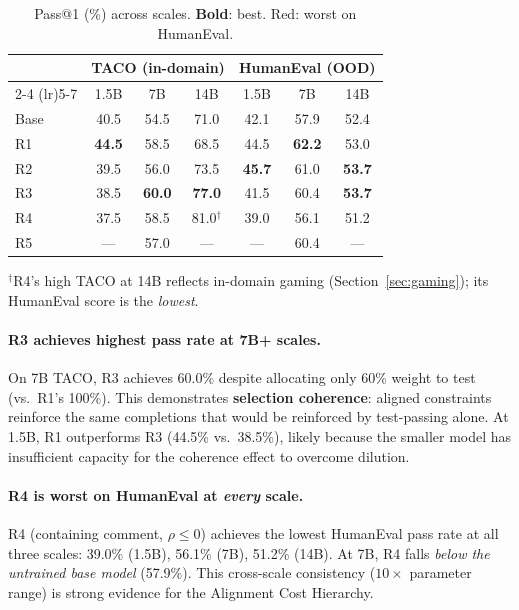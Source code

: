 \documentclass{article}
\begin{document}
\begin{table}[t]
\centering
\caption{Pass@1 (\%) across scales. \textbf{Bold}: best. \colorbox{red!10}{Red}: worst on HumanEval.}
\label{tab:pass_rates}
\begin{tabular}{lcccccc}
\toprule
& \multicolumn{3}{c}{TACO (in-domain)} & \multicolumn{3}{c}{HumanEval (OOD)} \\
\cmidrule(lr){2-4} \cmidrule(lr){5-7}
& 1.5B & 7B & 14B & 1.5B & 7B & 14B \\
\midrule
Base & 40.5 & 54.5 & 71.0 & 42.1 & 57.9 & 52.4 \\
R1 & \textbf{44.5} & 58.5 & 68.5 & 44.5 & \textbf{62.2} & 53.0 \\
R2 & 39.5 & 56.0 & 73.5 & \textbf{45.7} & 61.0 & \textbf{53.7} \\
R3 & 38.5 & \textbf{60.0} & \textbf{77.0} & 41.5 & 60.4 & \textbf{53.7} \\
R4 & 37.5 & 58.5 & 81.0$^\dagger$ & \colorbox{red!10}{39.0} & \colorbox{red!10}{56.1} & \colorbox{red!10}{51.2} \\
R5 & --- & 57.0 & --- & --- & 60.4 & --- \\
\bottomrule
\end{tabular}
\begin{flushleft}
\small $^\dagger$R4's high TACO at 14B reflects in-domain gaming (Section~\ref{sec:gaming}); its HumanEval score is the \emph{lowest}.
\end{flushleft}
\end{table}

\paragraph{R3 achieves highest pass rate at 7B+ scales.} On 7B TACO, R3 achieves 60.0\% despite allocating only 60\% weight to test (vs.\ R1's 100\%). This demonstrates \textbf{selection coherence}: aligned constraints reinforce the same completions that would be reinforced by test-passing alone. At 1.5B, R1 outperforms R3 (44.5\% vs.\ 38.5\%), likely because the smaller model has insufficient capacity for the coherence effect to overcome dilution.

\paragraph{R4 is worst on HumanEval at \emph{every} scale.} R4 (containing comment, $\rho \leq 0$) achieves the lowest HumanEval pass rate at all three scales: 39.0\% (1.5B), 56.1\% (7B), 51.2\% (14B). At 7B, R4 falls \emph{below the untrained base model} (57.9\%). This cross-scale consistency ($10\times$ parameter range) is strong evidence for the Alignment Cost Hierarchy.
\end{document}
